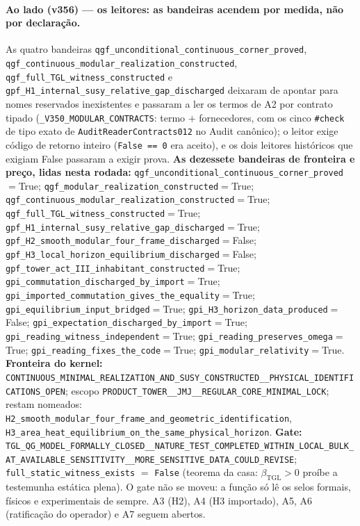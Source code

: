 \documentclass[11pt]{article}
\newcommand{\bTGL}{\beta_{\mathrm{TGL}}}\newcommand{\Msun}{M_{\odot}}\newcommand{\TGL}{\mathrm{TGL}}
\theoremstyle{definition}\newtheorem{deriv}{Derivação}
\begin{document}
\paragraph*{Ao lado (v356) --- os leitores: as bandeiras acendem por medida, não por declaração.} As quatro bandeiras \texttt{qgf\_unconditional\_continuous\_corner\_proved}, \texttt{qgf\_continuous\_modular\_realization\_constructed}, \texttt{qgf\_full\_TGL\_witness\_constructed} e \texttt{gpf\_H1\_internal\_susy\_relative\_gap\_discharged} deixaram de apontar para nomes reservados inexistentes e passaram a ler os termos de A2 por contrato tipado (\texttt{\_V350\_MODULAR\_CONTRACTS}: termo $+$ fornecedores, com os cinco \texttt{\#check} de tipo exato de \texttt{AuditReaderContracts012} no Audit canônico); o leitor exige código de retorno inteiro (\texttt{False == 0} era aceito), e os dois leitores históricos que exigiam False passaram a exigir prova. \textbf{As dezessete bandeiras de fronteira e preço, lidas nesta rodada:} \texttt{qgf\_unconditional\_continuous\_corner\_proved}$=$True; \texttt{qgf\_modular\_realization\_constructed}$=$True; \texttt{qgf\_continuous\_modular\_realization\_constructed}$=$True; \texttt{qgf\_full\_TGL\_witness\_constructed}$=$True; \texttt{gpf\_H1\_internal\_susy\_relative\_gap\_discharged}$=$True; \texttt{gpf\_H2\_smooth\_modular\_four\_frame\_discharged}$=$False; \texttt{gpf\_H3\_local\_horizon\_equilibrium\_discharged}$=$False; \texttt{gpf\_tower\_act\_III\_inhabitant\_constructed}$=$True; \texttt{gpi\_commutation\_discharged\_by\_import}$=$True; \texttt{gpi\_imported\_commutation\_gives\_the\_equality}$=$True; \texttt{gpi\_equilibrium\_input\_bridged}$=$True; \texttt{gpi\_H3\_horizon\_data\_produced}$=$False; \texttt{gpi\_expectation\_discharged\_by\_import}$=$True; \texttt{gpi\_reading\_witness\_independent}$=$True; \texttt{gpi\_reading\_preserves\_omega}$=$True; \texttt{gpi\_reading\_fixes\_the\_code}$=$True; \texttt{gpi\_modular\_relativity}$=$True. \textbf{Fronteira do kernel:} \texttt{CONTINUOUS\_MINIMAL\_REALIZATION\_AND\_SUSY\_CONSTRUCTED\_\_PHYSICAL\_IDENTIFICATIONS\_OPEN}; escopo \texttt{PRODUCT\_TOWER\_\_JMJ\_\_REGULAR\_CORE\_MINIMAL\_LOCK}; restam nomeados: \texttt{H2\_smooth\_modular\_four\_frame\_and\_geometric\_identification}, \texttt{H3\_area\_heat\_equilibrium\_on\_the\_same\_physical\_horizon}. \textbf{Gate:} \texttt{TGL\_QG\_MODEL\_FORMALLY\_CLOSED\_\_NATURE\_TEST\_COMPLETED\_WITHIN\_LOCAL\_BULK\_AT\_AVAILABLE\_SENSITIVITY\_\_MORE\_SENSITIVE\_DATA\_COULD\_REVISE}; \texttt{full\_static\_witness\_exists} $=$ \texttt{False} (teorema da casa: $\bTGL>0$ proíbe a testemunha estática plena). O gate não se moveu: a função só lê os selos formais, físicos e experimentais de sempre. A3 (H2), A4 (H3 importado), A5, A6 (ratificação do operador) e A7 seguem abertos.
\end{document}
